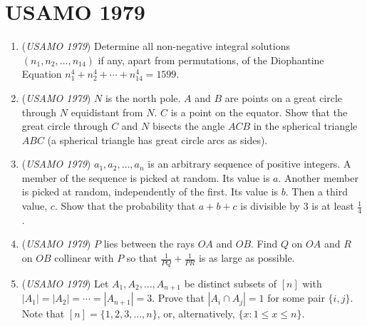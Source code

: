\section{USAMO 1979}
        \begin{enumerate}
        	\item (\textit{USAMO 1979}) Determine all non-negative integral solutions $(n_1,n_2,\dots , n_{14})$ if any, apart from permutations, of the Diophantine Equation $n_1^4+n_2^4+\cdots +n_{14}^4=1599$.


 

	\item (\textit{USAMO 1979}) $N$ is the north pole. $A$ and $B$ are points on a great circle through $N$ equidistant from $N$. $C$ is a point on the equator. Show that the great circle through $C$ and $N$ bisects the angle $ACB$ in the spherical triangle $ABC$ (a spherical triangle has great circle arcs as sides).


 

	\item (\textit{USAMO 1979}) $a_1, a_2, \ldots, a_n$ is an arbitrary sequence of positive integers. A member of the sequence is picked at 
random. Its value is $a$. Another member is picked at random, independently of the first. Its value is $b$. Then a third value, $c$. Show that the probability that $a + b + c$ is divisible by $3$ is at least $\frac14$.


 

	\item (\textit{USAMO 1979}) $P$ lies between the rays $OA$ and $OB$. Find $Q$ on $OA$ and $R$ on $OB$ collinear with $P$ so that $\frac{1}{PQ} + \frac{1}{PR}$ is as large as possible.


 

	\item (\textit{USAMO 1979}) Let $A_1,A_2,...,A_{n+1}$ be distinct subsets of $[n]$ with $|A_1|=|A_2|=\cdots =|A_{n+1}|=3$.  Prove that $|A_i\cap A_j|=1$ for some pair $\{i,j\}$. Note that $[n] = \{1, 2, 3, ..., n\}$, or, alternatively, $\{x: 1 \le x \le n\}$.


 

\end{enumerate}